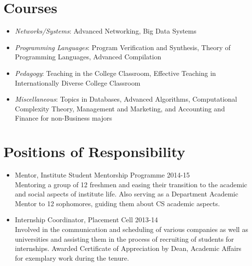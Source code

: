 \documentclass[11pt,a4paper,sans]{moderncv}        %
\begin{document}
\section{Courses}
\begin{itemize}
	\item \emph{Networks/Systems}: Advanced Networking, Big Data Systems
	\item \emph{Programming Languages}: Program Verification and Synthesis,
	Theory of Programming Languages, Advanced Compilation
	\item \emph{Pedagogy}: Teaching in the College Classroom, Effective
	Teaching in Internationally Diverse College Classroom
	\item \emph{Miscellaneous}: Topics in Databases, Advanced Algorithms,
	Computational Complexity Theory, Management and Marketing, and Accounting and Finance
	for non-Business majors
\end{itemize}

\section{Positions of Responsibility}
\begin{itemize}
\item Mentor, Institute Student Mentorship Programme \hfill 2014-15 \\
Mentoring a group of 12 freshmen and easing their transition to the academic and social aspects of institute life. Also serving as a Department Academic Mentor to 12 sophomores, guiding them about CS academic aspects.

\item Internship Coordinator, Placement Cell \hfill 2013-14 \\
Involved in the communication and scheduling of various companies as well as universities and assisting them in the process of recruiting of students for internships. Awarded Certificate of Appreciation by Dean, Academic Affairs for exemplary work during the tenure.

\end{itemize}


%


\end{document}
